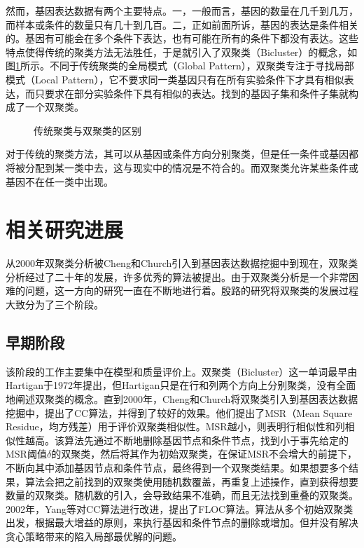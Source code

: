     然而，基因表达数据有两个主要特点。一，一般而言，基因的数量在几千到几万，而样本或条件的数量只有几十到几百。二，正如前面所诉，基因的表达是条件相关的。基因有可能会在多个条件下表达，也有可能在所有的条件下都没有表达。这些特点使得传统的聚类方法无法胜任，于是就引入了双聚类（Bicluster）的概念，如图\ref{fig:tradiAndBi}所示。不同于传统聚类的全局模式（Global Pattern），双聚类专注于寻找局部模式（Local Pattern），它不要求同一类基因只有在所有实验条件下才具有相似表达，而只要求在部分实验条件下具有相似的表达。找到的基因子集和条件子集就构成了一个双聚类。

    \begin{figure}[htbp]
    \setlength{\subfigcapskip}{-1bp}
    \centering
    \begin{minipage}{.9\textwidth}
    \centering
    \subfigure{}\addtocounter{subfigure}{-2}
    \subfigure{\subfigure[基因方向的传统聚类]{\texttt{[image: 1]}}}
    \hspace{.1em}
    \subfigure{}\addtocounter{subfigure}{-2}
    \subfigure{\subfigure[条件方向的传统聚类]{\texttt{[image: 2]}}}
    \hspace{.1em}
    \subfigure{}\addtocounter{subfigure}{-2}
    \subfigure{\subfigure[双聚类]{\texttt{[image: 3]}}}
    \end{minipage}
    \vspace{0.2em}
    \caption{传统聚类与双聚类的区别}
    \label{fig:tradiAndBi}
    \end{figure}
    对于传统的聚类方法，其可以从基因或条件方向分别聚类，但是任一条件或基因都将被分配到某一类中去，这与现实中的情况是不符合的。而双聚类允许某些条件或基因不在任一类中出现。

\section{相关研究进展}
    从2000年双聚类分析被Cheng和Church引入到基因表达数据挖掘中到现在，双聚类分析经过了二十年的发展，许多优秀的算法被提出。由于双聚类分析是一个非常困难的问题，这一方向的研究一直在不断地进行着。殷路的研究将双聚类的发展过程大致分为了三个阶段。

    \subsection{早期阶段}
    该阶段的工作主要集中在模型和质量评价上。双聚类（Bicluster）这一单词最早由Hartigan于1972年提出，但Hartigan只是在行和列两个方向上分别聚类，没有全面地阐述双聚类的概念。直到2000年，Cheng和Church将双聚类引入到基因表达数据挖掘中，提出了CC算法，并得到了较好的效果。他们提出了MSR（Mean Square Residue，均方残差）用于评价双聚类相似性。MSR越小，则表明行相似性和列相似性越高。该算法先通过不断地删除基因节点和条件节点，找到小于事先给定的MSR阈值$\delta$的双聚类，然后将其作为初始双聚类，在保证MSR不会增大的前提下，不断向其中添加基因节点和条件节点，最终得到一个双聚类结果。如果想要多个结果，算法会把之前找到的双聚类使用随机数覆盖，再重复上述操作，直到获得想要数量的双聚类。随机数的引入，会导致结果不准确，而且无法找到重叠的双聚类。2002年，Yang等对CC算法进行改进，提出了FLOC算法。算法从多个初始双聚类出发，根据最大增益的原则，来执行基因和条件节点的删除或增加。但并没有解决贪心策略带来的陷入局部最优解的问题。

